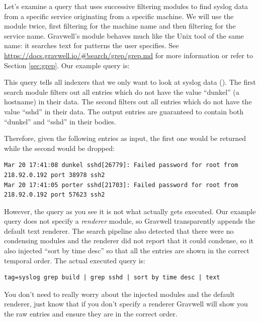 Let's examine a query that uses successive filtering modules to find
syslog data from a specific service originating from a specific machine.
We will use the
 module
twice, first filtering for the machine name and then filtering for the
service name. Gravwell's  module behaves much like the Unix tool of the same name: it searches text for patterns the user specifies. See \href{https://docs.gravwell.io/\#!search/grep/grep.md}{https://docs.gravwell.io/\#!search/grep/grep.md} for more information or refer to Section \ref{sec:grep}. Our example query is:


This query tells all indexers that we only want to look at syslog
data (). The first  search module filters out all entries which do not
have the value ``dunkel'' (a hostname) in their data. The second  filters out all
entries which do not have the value ``sshd'' in their data. The output
entries are guaranteed to contain both ``dunkel'' and ``sshd'' in their
bodies.

Therefore, given the following entries as input, the first one would be returned while the second would be dropped:

\begin{Verbatim}[breaklines=true]
Mar 20 17:41:08 dunkel sshd[26779]: Failed password for root from 218.92.0.192 port 38978 ssh2
Mar 20 17:41:05 porter sshd[21703]: Failed password for root from 218.92.0.192 port 57623 ssh2
\end{Verbatim}

However, the query as you see it is not what actually gets executed.
Our example query does not specify a \emph{renderer} module, so Gravwell
transparently appends the default text renderer. The search pipeline
also detected that there were no condensing modules and the renderer did
not report that it could condense, so it also injected ``sort by time
desc'' so that all the entries are shown in the correct temporal order.
The actual executed query is:

\begin{Verbatim}[breaklines=true]
tag=syslog grep build | grep sshd | sort by time desc | text
\end{Verbatim}

You don't need to really worry about the injected modules and the
default renderer, just know that if you don't specify a renderer
Gravwell will show you the raw entries and ensure they are in the
correct order.

